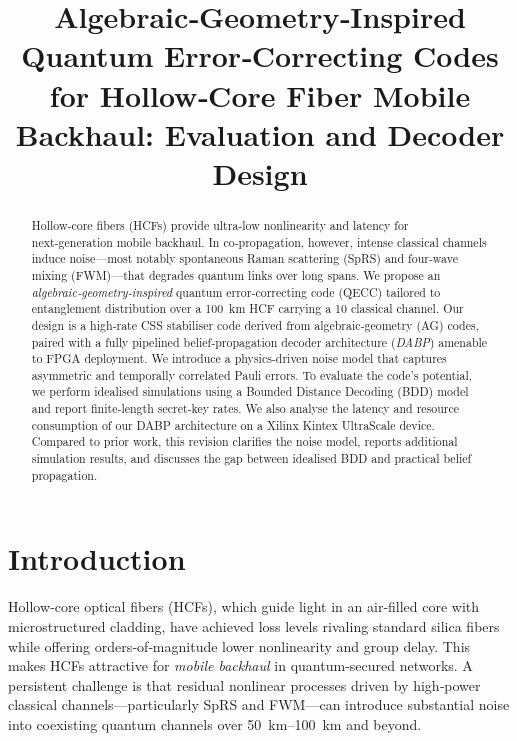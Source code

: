 \documentclass[conference]{IEEEtran}
\begin{document}
    \title{Algebraic‑Geometry‑Inspired Quantum Error‑Correcting Codes for Hollow‑Core Fiber Mobile Backhaul:\Enhanced 
Evaluation and Decoder Design}

    \author{}

    \maketitle

    \begin{abstract}
    Hollow‑core fibers (HCFs) provide ultra‑low nonlinearity and latency for next‑generation mobile backhaul.  In 
co‑propagation, however, intense classical channels induce noise—most notably spontaneous Raman scattering (SpRS) and 
four‑wave mixing (FWM)—that degrades quantum links over long spans.  We propose an \emph{algebraic‑geometry‑inspired} 
quantum error‑correcting code (QECC) tailored to entanglement distribution over a \SI{100}{\kilo\meter} HCF carrying a 
\SI{10}{\dBm} classical channel.  Our design is a high‑rate CSS stabiliser code derived from algebraic‑geometry (AG) 
codes, paired with a fully pipelined belief‑propagation decoder architecture (\emph{DABP}) amenable to FPGA deployment.
  We introduce a physics‑driven noise model that captures asymmetric and temporally correlated Pauli errors.  To 
evaluate the code's potential, we perform idealised simulations using a Bounded Distance Decoding (BDD) model and report
 finite‑length secret‑key rates.  We also analyse the latency and resource consumption of our DABP architecture on a 
Xilinx Kintex UltraScale device.  Compared to prior work, this revision clarifies the noise model, reports additional 
simulation results, and discusses the gap between idealised BDD and practical belief propagation.
    \end{abstract}

    \section{Introduction}
    Hollow‑core optical fibers (HCFs), which guide light in an air‑filled core with microstructured cladding, have 
achieved loss levels rivaling standard silica fibers while offering orders‑of‑magnitude lower nonlinearity and group 
delay.  This makes HCFs attractive for \emph{mobile backhaul} in quantum‑secured networks.  A persistent challenge is 
that residual nonlinear processes driven by high‑power classical channels—particularly SpRS and FWM—can introduce 
substantial noise into coexisting quantum channels over \SIrange{50}{100}{\kilo\meter} and beyond.
\end{document}
